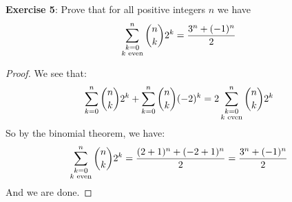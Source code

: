 \documentclass{article}
\begin{document}
\textbf{Exercise 5}: Prove that for all positive integers $n$ we have
    \begin{equation*}
        \sum_{\substack{k = 0 \\ k \text{ even}}}^{n} \dbinom{n}{k}2^{k} = \dfrac{3^{n} + (-1)^{n}}{2}
    \end{equation*}
    \begin{proof}
        We see that:
            \begin{equation*}
                \sum_{k = 0}^{n} \dbinom{n}{k}2^{k} + \sum_{k = 0}^{n} \dbinom{n}{k}(-2)^{k} = 2\sum_{\substack{k = 0 \\ k \text{ even}}}^{n} \dbinom{n}{k}2^{k}
            \end{equation*}
        So by the binomial theorem, we have:
            \begin{equation*}
                \sum_{\substack{k = 0 \\ k \text{ even}}}^{n} \dbinom{n}{k}2^{k} = \dfrac{(2 + 1)^{n} + (-2 + 1)^{n}}{2} = \dfrac{3^{n} + (-1)^{n}}{2}
            \end{equation*}
        And we are done.
    \end{proof}
\end{document}
